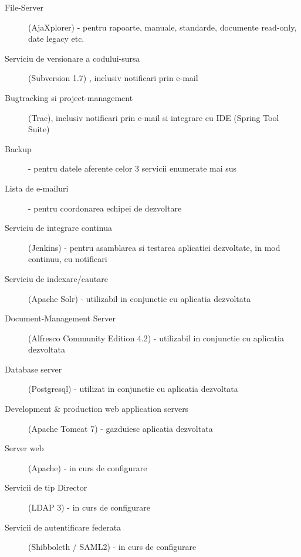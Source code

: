 \begin{description}

\item[File-Server] (AjaXplorer) - pentru rapoarte, manuale, standarde, documente read-only, date legacy etc.

\item[Serviciu de versionare a codului-sursa] (Subversion 1.7) , inclusiv
    notificari prin e-mail

\item[Bugtracking si project-management] (Trac), inclusiv notificari prin
    e-mail si integrare cu IDE (Spring Tool Suite)

\item[Backup] - pentru datele aferente celor 3 servicii enumerate mai sus

\item[Lista de e-mailuri] - pentru coordonarea echipei de dezvoltare

\item[Serviciu de integrare continua] (Jenkins) - pentru asamblarea si
    testarea aplicatiei dezvoltate, in mod continuu, cu notificari

\item[Serviciu de indexare/cautare] (Apache Solr) - utilizabil in
    conjunctie cu aplicatia dezvoltata

\item[Document-Management Server] (Alfresco Community Edition 4.2) -
    utilizabil in conjunctie cu aplicatia dezvoltata

\item[Database server] (Postgresql) - utilizat in conjunctie cu
    aplicatia dezvoltata

\item[Development \& production web application servers] (Apache Tomcat 7) -
    gazduiesc aplicatia dezvoltata

\item[Server web] (Apache) - in curs de configurare

\item[Servicii de tip Director] (LDAP 3) - in curs de configurare

\item[Servicii de autentificare federata] (Shibboleth / SAML2) - in curs de
configurare

\end{description}
